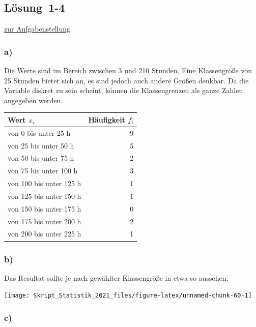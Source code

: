 \documentclass[
  11pt,
  ngerman,
  a4paper,
]{report}
\begin{document}
\hypertarget{loesung-1-4}{%
\subsection{Lösung~1-4}\label{loesung-1-4}}

\protect\hyperlink{aufgabe-1-4}{zur Aufgabenstellung}

\hypertarget{a-1}{%
\subsubsection{a)}\label{a-1}}

Die Werte sind im Bereich zwischen 3 und 210 Stunden. Eine Klassengröße von 25 Stunden bietet sich an, es sind jedoch auch andere Größen denkbar. Da die Variable diskret zu sein scheint, können die Klassengrenzen als ganze Zahlen angegeben werden.

\begin{table}[H]
\centering
\begin{tabular}{lr}
\toprule
\textbf{Wert $x_i$} & \textbf{Häufigkeit $f_i$}\\
\midrule
von 0 bis unter 25 h & 9\\
von 25 bis unter 50 h & 5\\
von 50 bis unter 75 h & 2\\
von 75 bis unter 100 h & 3\\
von 100 bis unter 125 h & 1\\
von 125 bis unter 150 h & 1\\
von 150 bis unter 175 h & 0\\
von 175 bis unter 200 h & 2\\
von 200 bis unter 225 h & 1\\
\bottomrule
\end{tabular}
\end{table}

\hypertarget{b-1}{%
\subsubsection{b)}\label{b-1}}

Das Resultat sollte je nach gewählter Klassengröße in etwa so aussehen:

\begin{center}\texttt{[image: Skript\_Statistik\_2021\_files/figure-latex/unnamed-chunk-60-1]} \end{center}

\hypertarget{c-1}{%
\subsubsection{c)}\label{c-1}}
\end{document}

